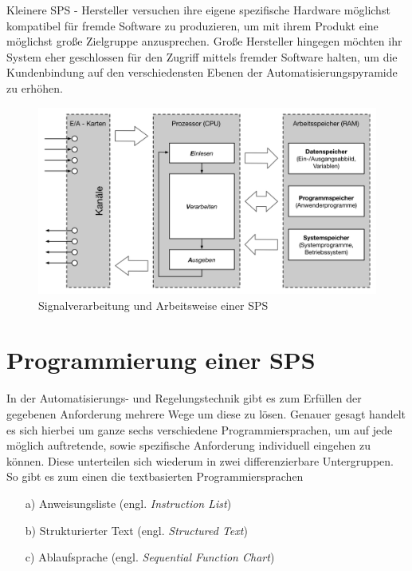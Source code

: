 	Kleinere SPS - Hersteller versuchen ihre eigene spezifische Hardware möglichst kompatibel für fremde Software zu produzieren, um mit ihrem Produkt eine möglichst große Zielgruppe anzusprechen. Große Hersteller hingegen möchten ihr System eher geschlossen für den Zugriff mittels fremder Software halten, um die Kundenbindung auf den verschiedensten Ebenen der Automatisierungspyramide zu erhöhen.
	
	\begin{figure}[h!]
  		\centering
    	\includegraphics[width=1\textwidth]{graphics/stateoftheart/Signalverarbeitung_Selfmade.png}
  		\caption{Signalverarbeitung und Arbeitsweise einer SPS \cite{mseitz_sps}}
	\end{figure}
		
	\section{Programmierung einer SPS}

	In der Automatisierungs- und Regelungstechnik gibt es zum Erfüllen der gegebenen Anforderung mehrere Wege um diese zu lösen. Genauer gesagt handelt es sich hierbei um ganze sechs verschiedene Programmiersprachen, um auf jede möglich auftretende, sowie spezifische Anforderung individuell eingehen zu können. Diese unterteilen sich wiederum in zwei differenzierbare Untergruppen. So gibt es zum einen die textbasierten Programmiersprachen
	
	\begin{itemize}
		\item[a)] Anweisungsliste (engl. \textit{Instruction List})
		\item[b)] Strukturierter Text (engl. \textit{Structured Text})
		\item[c)] Ablaufsprache (engl. \textit{Sequential Function Chart})
	\end{itemize}


